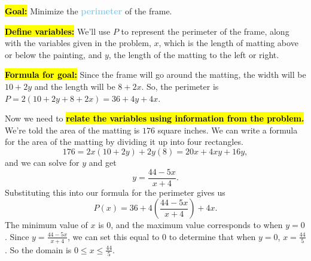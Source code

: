\documentclass{article}
\newcommand{\highlight}[1]{\boldmath\hl{\textbf{#1}}\unboldmath}
\newcommand{\goal}[1]{\textbf{\textcolor{skyblue}{#1}}}
\begin{document}
\begin{enumerate}
  \begin{solution}
    \highlight{Goal:} Minimize the \goal{perimeter} of the frame.

    \highlight{Define variables:} We'll use $P$ to represent the perimeter of the frame, 
    along with the variables given in the problem, $x$, which is the length of matting
    above or below the painting, and $y$, the length of the matting to the left or right.


    
    \highlight{Formula for goal:} Since the frame will go around the matting, the width will be $10+2y$ and the length will be $8+2x$. So, the perimeter is $P=2(10+2y+8+2x)=36+4y+4x$.

    Now we need to \highlight{relate the variables using information from the problem.} 
    We're told the area of the matting is $176$ square inches. We can write a formula
    for the area of the matting by dividing it up into four rectangles.
    \[
    176=2x(10+2y)+2y(8)=20x+4xy+16y,
    \] and we can solve for $y$ and get \[y=\frac{44-5x}{x+4}.\] Substituting
    this into our formula for the perimeter gives us 
    \[P(x)=36+4\left(\frac{44-5x}{x+4}\right)+4x.\]
    The minimum value of $x$ is $0$, and the maximum value corresponds to when $y=0$.
    Since $y=\frac{44-5x}{x+4}$, we can set this equal to $0$ to determine that when $y=0$,
    $x=\frac{44}{5}$. So the domain is $0 \leq x \leq \frac{44}{5}$.


\end{solution}
\end{enumerate}
\end{document}

